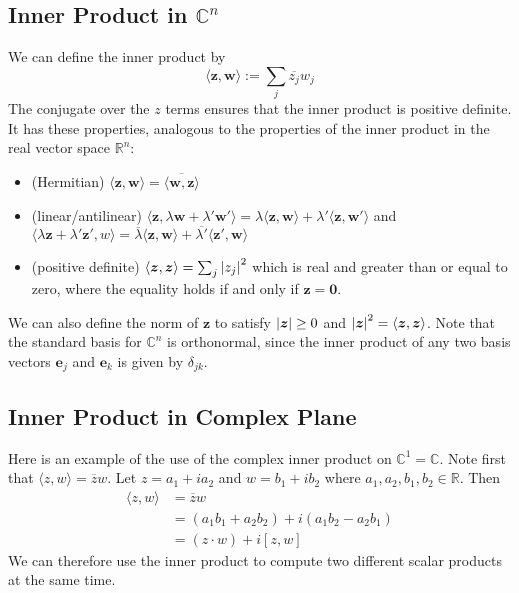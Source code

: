 \documentclass{article}
\begin{document}
\subsection{Inner Product in $\mathbb C^n$}
We can define the inner product by
\[ \langle \bm z, \bm w \rangle := \sum_j \overline{z_j} w_j \]
The conjugate over the $z$ terms ensures that the inner product is positive definite. It has these properties, analogous to the properties of the inner product in the real vector space $\mathbb R^n$:
\begin{itemize}
	\item (Hermitian) $\langle \bm z, \bm w \rangle = \overline{\langle \bm w, \bm z \rangle}$
	\item (linear/antilinear) $\langle \bm z, \lambda \bm w + \lambda' \bm w' \rangle = \lambda \langle \bm z, \bm w \rangle + \lambda' \langle \bm z, \bm w' \rangle$ and $\langle \lambda \bm z + \lambda' \bm z', w \rangle = \overline{\lambda} \langle \bm z, \bm w \rangle + \overline{\lambda'} \langle \bm z', \bm w \rangle$
	\item (positive definite) $\langle \bm z, \bm z \rangle = \sum_j \abs{z_j}^2$ which is real and greater than or equal to zero, where the equality holds if and only if $\bm z = \bm 0$.
\end{itemize}
We can also define the norm of $\bm z$ to satisfy $\abs{\bm z} \geq 0$ and $\abs{\bm z}^2 = \langle \bm z, \bm z \rangle$. Note that the standard basis for $\mathbb C^n$ is orthonormal, since the inner product of any two basis vectors $\bm e_j$ and $\bm e_k$ is given by $\delta_{jk}$.

\subsection{Inner Product in Complex Plane}
Here is an example of the use of the complex inner product on $\mathbb C^1 = \mathbb C$. Note first that $\langle z, w \rangle = \overline z w$. Let $z = a_1 + ia_2$ and $w = b_1 + ib_2$ where $a_1, a_2, b_1, b_2 \in \mathbb R$. Then
\begin{align*}
	\langle z, w \rangle & = \overline z w                              \\
	                     & = (a_1 b_1 + a_2 b_2) + i(a_1 b_2 - a_2 b_1) \\
	                     & = (z \cdot w) + i[z, w]
\end{align*}
We can therefore use the inner product to compute two different scalar products at the same time.
\end{document}
